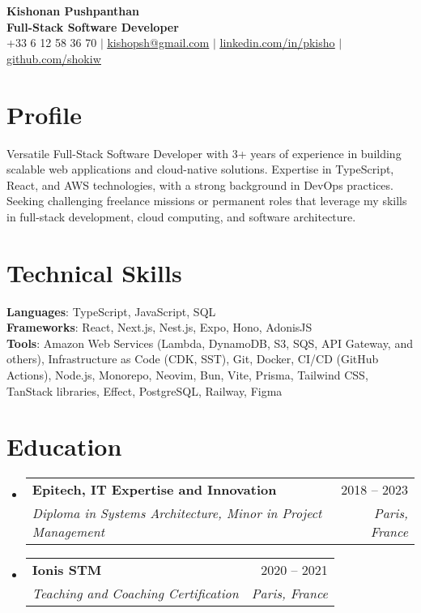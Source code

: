 \documentclass[letterpaper,11pt]{article}
\makeatletter
\newcommand{\resumeSubheading}[4]{
  \vspace{-2pt}\item
    \begin{tabular*}{0.97\textwidth}[t]{l@{\extracolsep{\fill}}r}
      \textbf{#1} & #2 \\
      \textit{\small#3} & \textit{\small #4} \\
    \end{tabular*}\vspace{-7pt}
}
\newcommand{\resumeSubHeadingListStart}{\begin{itemize}[leftmargin=0.15in, label={}]}
\newcommand{\resumeSubHeadingListEnd}{\end{itemize}}
\makeatother
\begin{document}
\begin{center}
    \textbf{\LARGE Kishonan Pushpanthan} \\ \vspace{3pt}
    \textbf{\large Full-Stack Software Developer} \\ \vspace{10pt}
    \small +33 6 12 58 36 70 $|$ \href{mailto:kishopsh@gmail.com}{\underline{kishopsh@gmail.com}} $|$
    \href{https://linkedin.com/in/pkisho}{\underline{linkedin.com/in/pkisho}} $|$
    \href{https://github.com/shokiw}{\underline{github.com/shokiw}}
\end{center}

\section{Profile}
\small{
Versatile Full-Stack Software Developer with 3+ years of experience in building scalable web applications and cloud-native solutions. Expertise in TypeScript, React, and AWS technologies, with a strong background in DevOps practices. 
Seeking challenging freelance missions or permanent roles that leverage my skills in full-stack development, cloud computing, and software architecture. 
}

\section{Technical Skills}
 \begin{itemize}[leftmargin=0.15in, label={}]
    \small{\item{
     \textbf{Languages}{: TypeScript, JavaScript, SQL} \\
     \textbf{Frameworks}{: React, Next.js, Nest.js, Expo, Hono, AdonisJS} \\
     \textbf{Tools}{: Amazon Web Services (Lambda, DynamoDB, S3, SQS, API Gateway, and others), Infrastructure as Code (CDK, SST), Git, Docker, CI/CD (GitHub Actions), Node.js, Monorepo, Neovim, Bun, Vite, Prisma, Tailwind CSS, TanStack libraries, Effect, PostgreSQL, Railway, Figma} \\
    }}
 \end{itemize}

\section{Education}
  \resumeSubHeadingListStart
    \resumeSubheading
      {Epitech, IT Expertise and Innovation}{2018 -- 2023}
      {Diploma in Systems Architecture, Minor in Project Management}{Paris, France}
    \resumeSubheading
      {Ionis STM}{2020 -- 2021}
      {Teaching and Coaching Certification}{Paris, France}
  \resumeSubHeadingListEnd
\end{document}
